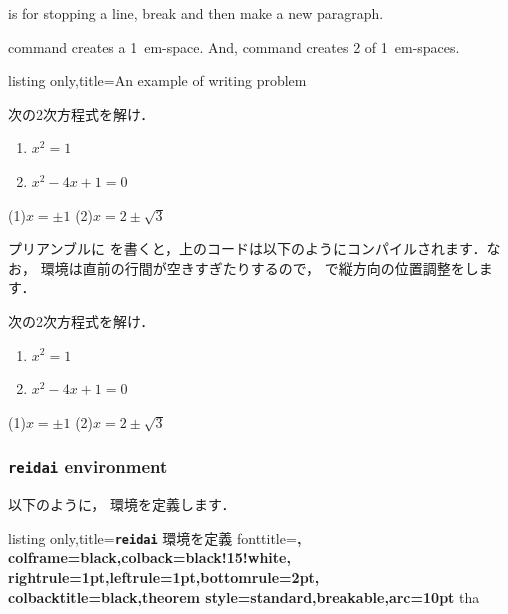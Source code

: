 \documentclass[../geometrymemo.tex]{subfiles}
\begin{document}
\lstinlineiv{\par} is for stopping a line, break and then make a new paragraph.

\lstinlineiv{\quad} command creates a \qty{1}{em}-space. And, \lstinlineiv{\qquad} command creates 2 of \qty{1}{em}-spaces.

\begin{tcblisting}{listing only,title=An example of writing problem}
    \noindent{}\par
    次の2次方程式を解け．\vspace{-8pt}
    \begin{enumerate}[(1)\;]
        \item \(x^2=1\)
        \item \(x^2-4x+1=0\)
    \end{enumerate}
    \noindent{}\par
    (1)\quad \(x=\pm 1\) \qquad
    (2)\quad \(x=2 \pm \sqrt{3}\)
\end{tcblisting}

プリアンブルに \lstinlineiv{\usepackage{enumerate}} を書くと，上のコードは以下のようにコンパイルされます．なお， 環境は直前の行間が空きすぎたりするので，\lstinlineiv{\vspace{-8pt}} で縦方向の位置調整をします．

\noindent{}\par
次の2次方程式を解け．\vspace{-8pt}
\begin{enumerate}[(1)\;]
    \item \(x^2=1\)
    \item \(x^2-4x+1=0\)
\end{enumerate}
\noindent{}\par
(1)\quad \(x=\pm 1\) \qquad
(2)\quad \(x=2 \pm \sqrt{3}\)

\subsubsection{\textbf{\texttt{reidai}} environment}
\label{sec:reidai}

以下のように， 環境を定義します．

\begin{tcblisting}{listing only,title=\texttt{\textbf{reidai}} 環境を定義}
    {fonttitle=\gtfamily\sffamily\bfseries\upshape\large,
        colframe=black,colback=black!15!white,
        rightrule=1pt,leftrule=1pt,bottomrule=2pt,
        colbacktitle=black,theorem style=standard,breakable,arc=10pt}
    {tha}
\end{tcblisting}
\end{document}
